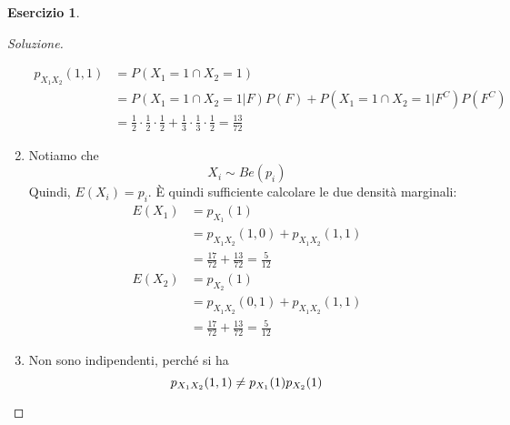 \documentclass{article}
\theoremstyle{plain}
\theoremstyle{definition}
\newtheorem{esercizio}{Esercizio}[section]
\theoremstyle{remark}
\newenvironment{soluzione}
	{\renewcommand\qedsymbol{$\mathwitch*$}\begin{proof}[Soluzione]}
	{\end{proof}}
\renewcommand{\qedsymbol}{$\mathrightghost$}
\begin{document}
\begin{esercizio}
\begin{soluzione}
\begin{enumerate}
\begin{align*}
				p_{X_1X_2}(1,1)&=P(X_1=1\cap X_2=1)\\
				&=P(X_1=1\cap X_2=1|F)P(F)+P(X_1=1\cap X_2=1|F^C)P(F^C)\\
				&=\frac{1}{2}\cdot\frac{1}{2}\cdot\frac{1}{2}+\frac{1}{3}\cdot\frac{1}{3}\cdot\frac{1}{2}=\frac{13}{72}
			\end{align*}
			\item Notiamo che
			\begin{equation*}
				X_i\sim Be(p_i)
			\end{equation*}
			Quindi, $E(X_i)=p_i$. È quindi sufficiente calcolare le due densità marginali:
			\begin{align*}
				E(X_1)&=p_{X_1}(1)\\
				&=p_{X_1X_2}(1,0)+p_{X_1X_2}(1,1)\\
				&=\frac{17}{72}+\frac{13}{72}=\frac{5}{12}\\
				E(X_2)&=p_{X_2}(1)\\
				&=p_{X_1X_2}(0,1)+p_{X_1X_2}(1,1)\\
				&=\frac{17}{72}+\frac{13}{72}=\frac{5}{12}
			\end{align*}
			\item Non sono indipendenti, perché si ha
			\begin{equation*}
				p_{X_1X_2}(1,1)\neq p_{X_1}(1)p_{X_2}(1)\qedhere
			\end{equation*}
		\end{enumerate}
	\end{soluzione}
\end{esercizio}
\end{document}

